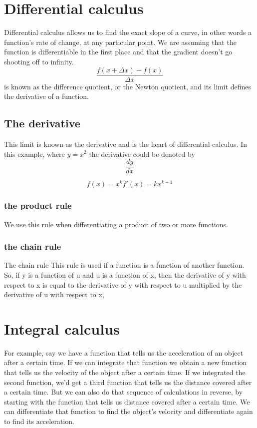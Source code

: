 \section{Differential calculus}
Differential calculus allows us to find the exact slope of a curve, in other words a function's rate of change, at any particular point. We are assuming that the function is differentiable in the first place and that the gradient doesn't go shooting off to infinity.
\[
\frac{f(x + \Delta x) - f(x)}{\Delta x}
\]
is known as the difference quotient, or the Newton quotient, and its limit defines the derivative of a function.


\subsection{The derivative}
This limit is known as the derivative and is the heart of differential calculus. In this example, where $y = x^2$ the derivative could be denoted by
\[
\frac{dy}{dx}
\]

\[
f(x) = x^k 
f'(x) = kx^{k-1}
\]

\subsubsection{the product rule}
We use this rule when differentiating a product of two or more functions.

\subsubsection{the chain rule}
The chain rule This rule is used if a function is a function of another function. So, if y is a function of u and u is a function of x, then the derivative of y with respect to x is equal to the derivative of y with respect to u multiplied by the derivative of u with respect to x,

\section{Integral calculus}
For example, say we have a function that tells us the acceleration of an object after a certain time. If we can integrate that function we obtain a new function that tells us the velocity of the object after a certain time. If we integrated the second function, we'd get a third function that tells us the distance covered after a certain time. But we can also do that sequence of calculations in reverse, by starting with the function that tells us distance covered after a certain time. We can differentiate that function to find the object's velocity and differentiate again to find its acceleration.

